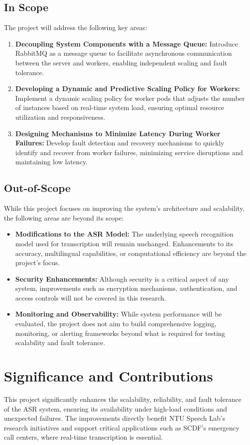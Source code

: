 \subsection{In Scope}
The project will address the following key areas:
\begin{enumerate}
    \item \textbf{Decoupling System Components with a Message Queue:} Introduce RabbitMQ as a message queue to facilitate asynchronous communication between the server and workers, enabling independent scaling and fault tolerance.
    \item \textbf{Developing a Dynamic and Predictive Scaling Policy for Workers:} Implement a dynamic scaling policy for worker pods that adjusts the number of instances based on real-time system load, ensuring optimal resource utilization and responsiveness.
    \item \textbf{Designing Mechanisms to Minimize Latency During Worker Failures:} Develop fault detection and recovery mechanisms to quickly identify and recover from worker failures, minimizing service disruptions and maintaining low latency.
\end{enumerate}

\subsection{Out-of-Scope}
While this project focuses on improving the system’s architecture and scalability, the following areas are beyond its scope:
\begin{itemize}
    \item \textbf{Modifications to the ASR Model:} The underlying speech recognition model used for transcription will remain unchanged. Enhancements to its accuracy, multilingual capabilities, or computational efficiency are beyond the project's focus.
    \item \textbf{Security Enhancements:} Although security is a critical aspect of any system, improvements such as encryption mechanisms, authentication, and access controls will not be covered in this research.
    \item \textbf{Monitoring and Observability:} While system performance will be evaluated, the project does not aim to build comprehensive logging, monitoring, or alerting frameworks beyond what is required for testing scalability and fault tolerance.
\end{itemize}

\section{Significance and Contributions}
This project significantly enhances the scalability, reliability, and fault tolerance of the ASR system, ensuring its availability under high-load conditions and unexpected failures. The improvements directly benefit NTU Speech Lab’s research initiatives and support critical applications such as SCDF’s emergency call centers, where real-time transcription is essential. 


